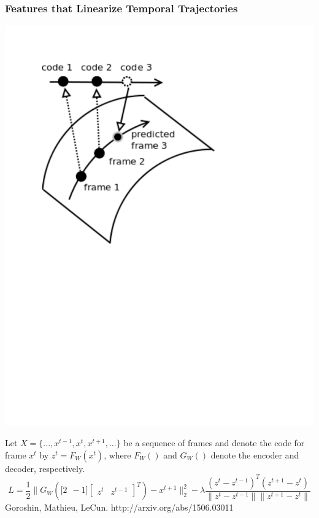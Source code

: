 \documentclass{beamer}
\begin{document}
\begin{frame} 
\frametitle{Features that Linearize Temporal Trajectories}
\begin{center} 
\includegraphics[scale=0.27, trim= 15 350 200 39, clip]{./Figures/Project2/linearize_manifold.pdf} 
\end{center} 
Let $X = \{...,x^{t-1},x^t,x^{t+1},...\}$ be a sequence of frames and denote the code for frame $x^t$ by $z^t = F_W(x^t)$, 
where $F_W()$ and $G_W()$ denote the encoder and decoder, respectively. \\
\begin{equation}
\nonumber
L = \frac{1}{2}\| G_W(\mathbf [2 ~~-1] \begin{bmatrix}z^t&z^{t-1}\end{bmatrix}^T) - x^{t+1} \|^2_2 - \lambda \frac{(z^t - z^{t-1})^T(z^{t+1} - z^t)}{\|z^t-z^{t-1}\| \|z^{t+1} - z^t\|}
\label{eqn:loss} 
\end{equation} 
\tiny{Goroshin, Mathieu, LeCun. http://arxiv.org/abs/1506.03011} 
\end{frame} 
\end{document}
